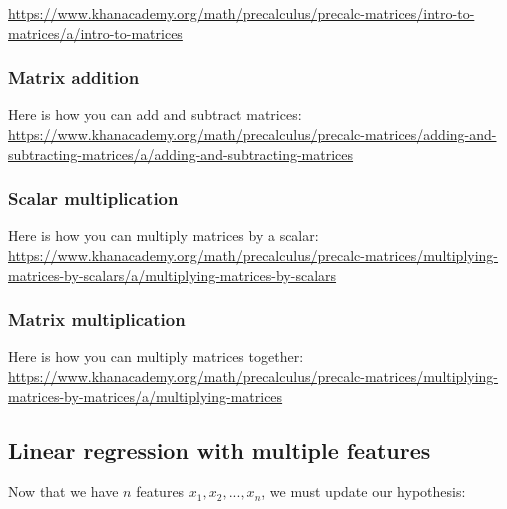\documentclass[11pt]{article}
\begin{document}
\href{https://www.khanacademy.org/math/precalculus/precalc-matrices/intro-to-matrices/a/intro-to-matrices}{https://www.khanacademy.org/math/precalculus/precalc-matrices/intro-to-matrices/a/intro-to-matrices}

\subsubsection{Matrix addition}

Here is how you can add and subtract matrices: \\

\href{https://www.khanacademy.org/math/precalculus/precalc-matrices/adding-and-subtracting-matrices/a/adding-and-subtracting-matrices}{https://www.khanacademy.org/math/precalculus/precalc-matrices/adding-and-subtracting-matrices/a/adding-and-subtracting-matrices}

\subsubsection{Scalar multiplication}

Here is how you can multiply matrices by a scalar:\\

 \href{https://www.khanacademy.org/math/precalculus/precalc-matrices/multiplying-matrices-by-scalars/a/multiplying-matrices-by-scalars}{https://www.khanacademy.org/math/precalculus/precalc-matrices/multiplying-matrices-by-scalars/a/multiplying-matrices-by-scalars}


\subsubsection{Matrix multiplication}

Here is how you can multiply matrices together: \\

\href{https://www.khanacademy.org/math/precalculus/precalc-matrices/multiplying-matrices-by-matrices/a/multiplying-matrices}{https://www.khanacademy.org/math/precalculus/precalc-matrices/multiplying-matrices-by-matrices/a/multiplying-matrices}

\subsection{Linear regression with multiple features}

Now that we have $n$ features $x_1, x_2, ..., x_n$, we must update our hypothesis:\\
\end{document}
